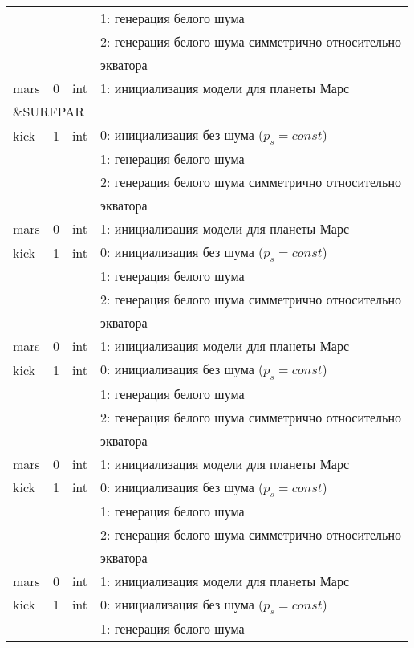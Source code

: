 \begin{longtable}[c]{|l|c|l|l|}
      &   &     & 1: генерация белого шума                  \\
      &   &     & 2: генерация белого шума симметрично относительно \\
  & & & экватора    \\
 mars & 0 & int & 1: инициализация модели для планеты Марс     \\
 \hline
 \multicolumn{4}{|l|}{\&SURFPAR}        \\ \hline
kick & 1 & int & 0: инициализация без шума ($p_s = const$) \\
      &   &     & 1: генерация белого шума                  \\
      &   &     & 2: генерация белого шума симметрично относительно \\
  & & & экватора    \\
 mars & 0 & int & 1: инициализация модели для планеты Марс     \\
kick & 1 & int & 0: инициализация без шума ($p_s = const$) \\
      &   &     & 1: генерация белого шума                  \\
      &   &     & 2: генерация белого шума симметрично относительно \\
  & & & экватора    \\
 mars & 0 & int & 1: инициализация модели для планеты Марс     \\
kick & 1 & int & 0: инициализация без шума ($p_s = const$) \\
      &   &     & 1: генерация белого шума                  \\
      &   &     & 2: генерация белого шума симметрично относительно \\
  & & & экватора    \\
 mars & 0 & int & 1: инициализация модели для планеты Марс     \\
kick & 1 & int & 0: инициализация без шума ($p_s = const$) \\
      &   &     & 1: генерация белого шума                  \\
      &   &     & 2: генерация белого шума симметрично относительно \\
  & & & экватора    \\
 mars & 0 & int & 1: инициализация модели для планеты Марс     \\
kick & 1 & int & 0: инициализация без шума ($p_s = const$) \\
      &   &     & 1: генерация белого шума                  \\

\end{longtable}
